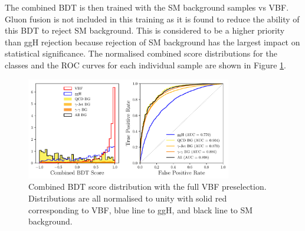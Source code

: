 The combined BDT is then trained with the SM background samples vs VBF. Gluon fusion is not included in this training as it is found to reduce the ability of this BDT to reject SM background. This is considered to be a higher priority than ggH rejection because rejection of SM background has the largest impact on statistical significance. 
The normalised combined score distributions for the classes and the ROC curves for each individual sample are shown in Figure \ref{fig:event_categorisaton:combined_bdt_performance}.
\begin{figure}[h!]
    \centering
        \includegraphics[width=0.8\textwidth]{figures/event_selection/combined_BDT_PS.pdf}
    \caption{Combined BDT score distribution with the full VBF preselection. Distributions are all normalised to unity with solid red corresponding to VBF, blue line to ggH, and black line to SM background.}
    \label{fig:event_categorisaton:combined_bdt_performance}
\end{figure}



